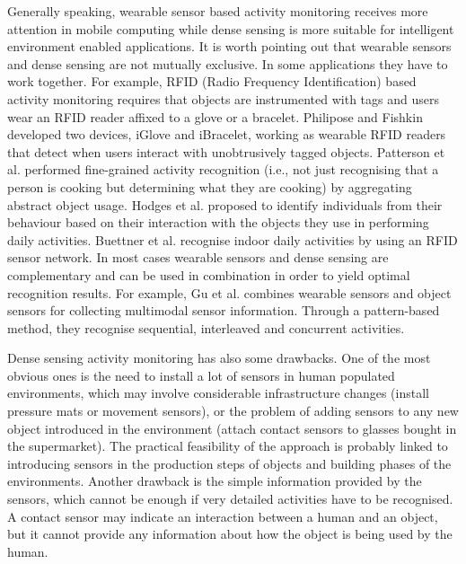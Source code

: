 Generally speaking, wearable sensor based activity monitoring receives more attention in mobile computing while dense sensing is more suitable for intelligent environment enabled applications. It is worth pointing out that wearable sensors and dense sensing are not mutually exclusive. In some applications they have to work together. For example, RFID (Radio Frequency Identification) based activity monitoring requires that objects are instrumented with tags and users wear an RFID reader affixed to a glove or a bracelet. Philipose and Fishkin \cite{Philipose2004} \cite{Fishkin2005} developed two devices, iGlove and iBracelet, working as wearable RFID readers that detect when users interact with unobtrusively tagged objects. Patterson et al. \cite{Patterson2005} performed fine-grained activity recognition (i.e., not just recognising that a person is cooking but determining what they are cooking) by aggregating abstract object usage. Hodges et al. \cite{Hodges2007} proposed to identify individuals from their behaviour based on their interaction with the objects they use in performing daily activities. Buettner et al. \cite{Buettner2009} recognise indoor daily activities by using an RFID sensor network. In most cases wearable sensors and dense sensing are complementary and can be used in combination in order to yield optimal recognition results. For example, Gu et al. \cite{Gu2009} combines wearable sensors and object sensors for collecting multimodal sensor information. Through a pattern-based method, they recognise sequential, interleaved and concurrent activities.

Dense sensing activity monitoring has also some drawbacks. One of the most obvious ones is the need to install a lot of sensors in human populated environments, which may involve considerable infrastructure changes (install pressure mats or movement sensors), or the problem of adding sensors to any new object introduced in the environment (attach contact sensors to glasses bought in the supermarket). The practical feasibility of the approach is probably linked to introducing sensors in the production steps of objects and building phases of the environments. Another drawback is the simple information provided by the sensors, which cannot be enough if very detailed activities have to be recognised. A contact sensor may indicate an interaction between a human and an object, but it cannot provide any information about how the object is being used by the human. 